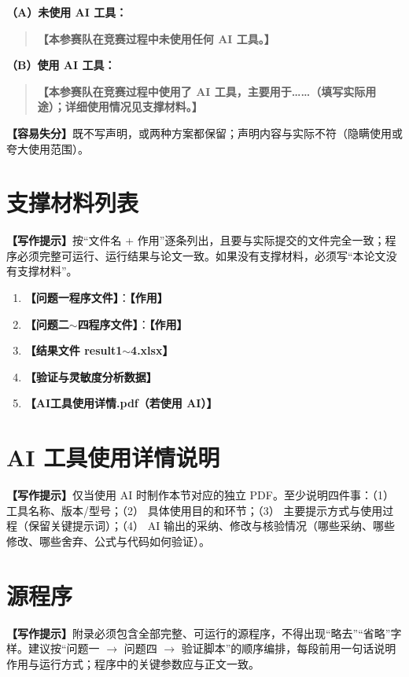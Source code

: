\documentclass[12pt,a4paper]{article}
\newcommand{\prompt}[1]{\par\noindent\textbf{【写作提示】}#1\par}      %
\newcommand{\pitfall}[1]{\par\noindent\textbf{【容易失分】}#1\par}     %
\newcommand{\ph}[1]{\textbf{【#1】}}                                   %
\begin{document}
\noindent\textbf{（A）未使用 AI 工具：}

\begin{quote}
\ph{本参赛队在竞赛过程中未使用任何 AI 工具。}
\end{quote}

\noindent\textbf{（B）使用 AI 工具：}

\begin{quote}
\ph{本参赛队在竞赛过程中使用了 AI 工具，主要用于……（填写实际用途）；详细使用情况见支撑材料。}
\end{quote}

\pitfall{既不写声明，或两种方案都保留；声明内容与实际不符（隐瞒使用或夸大使用范围）。}

\clearpage
\appendix

\section{支撑材料列表}

\prompt{按“文件名 + 作用”逐条列出，且要与实际提交的文件完全一致；程序必须完整可运行、运行结果与论文一致。如果没有支撑材料，必须写“本论文没有支撑材料”。}

\begin{enumerate}[label=(\arabic*)]
  \item \ph{问题一程序文件}：\ph{作用}
  \item \ph{问题二$\sim$四程序文件}：\ph{作用}
  \item \ph{结果文件 result1$\sim$4.xlsx}
  \item \ph{验证与灵敏度分析数据}
  \item \ph{AI工具使用详情.pdf（若使用 AI）}
\end{enumerate}

\section{AI 工具使用详情说明}

\prompt{仅当使用 AI 时制作本节对应的独立 PDF。至少说明四件事：（1） 工具名称、版本/型号；（2） 具体使用目的和环节；（3） 主要提示方式与使用过程（保留关键提示词）；（4） AI 输出的采纳、修改与核验情况（哪些采纳、哪些修改、哪些舍弃、公式与代码如何验证）。}

\section{源程序}

\prompt{附录必须包含全部完整、可运行的源程序，不得出现“略去”“省略”字样。建议按“问题一 $\rightarrow$ 问题四 $\rightarrow$ 验证脚本”的顺序编排，每段前用一句话说明作用与运行方式；程序中的关键参数应与正文一致。}
\end{document}
